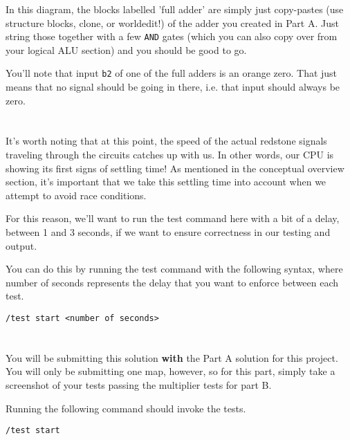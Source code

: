 \documentclass{article}
\begin{document}
In this diagram, the blocks labelled 'full adder' are simply just copy-pastes (use structure blocks, clone, or worldedit!) of the adder you created in Part A. Just string those together with a few \texttt{AND} gates (which you can also copy over from your logical ALU section) and you should be good to go.

You'll note that input \texttt{b2} of one of the full adders is an orange zero. That just means that no signal should be going in there, i.e. that input should always be zero.

\section{\selectfont{Testing Part B}}

It's worth noting that at this point, the speed of the actual redstone signals traveling through the circuits catches up with us. In other words, our CPU is showing its first signs of settling time! As mentioned in the conceptual overview section, it's important that we take this settling time into account when we attempt to avoid race conditions. 

For this reason, we'll want to run the test command here with a bit of a delay, between 1 and 3 seconds, if we want to ensure correctness in our testing and output.

You can do this by running the test command with the following syntax, where number of seconds represents the delay that you want to enforce between each test.

\begin{tcolorbox}
  \texttt{/test start <number of seconds>}
\end{tcolorbox}

\section{\selectfont{Submission Of Part B}}

You will be submitting this solution \textbf{with} the Part A solution for this project. You will only be submitting one map, however, so for this part, simply take a screenshot of your tests passing the multiplier tests for part B.

Running the following command should invoke the tests.

\begin{tcolorbox}
  \texttt{/test start}
\end{tcolorbox}
\end{document}
